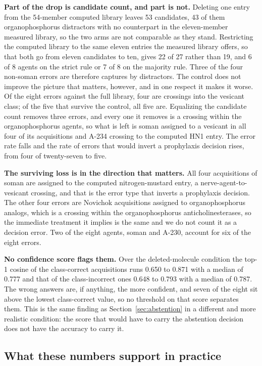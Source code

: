 \documentclass[review,12pt]{elsarticle}
\begin{document}
\textbf{Part of the drop is candidate count, and part is not.} Deleting one entry from the
54-member computed library leaves 53 candidates, 43 of them organophosphorus distractors
with no counterpart in the eleven-member measured library, so the two arms are not
comparable as they stand. Restricting the computed library to the same eleven entries the
measured library offers, so that both go from eleven candidates to ten, gives 22 of 27
rather than 19, and 6 of 8 agents on the strict rule or 7 of 8 on the majority rule. Three
of the four non-soman errors are therefore captures by distractors. The control does not
improve the picture that matters, however, and in one respect it makes it worse. Of the
eight errors against the full library, four are crossings into the vesicant class; of the
five that survive the control, all five are. Equalizing the candidate count removes three
errors, and every one it removes is a crossing within the organophosphorus agents, so what
is left is soman assigned to a vesicant in all four of its acquisitions and A-234 crossing
to the computed HN1 entry. The error rate falls and the rate of errors that would invert a
prophylaxis decision rises, from four of twenty-seven to five.

\textbf{The surviving loss is in the direction that matters.} All four acquisitions of
soman are assigned to the computed nitrogen-mustard entry, a nerve-agent-to-vesicant
crossing, and that is the error type that inverts a prophylaxis decision. The other four
errors are Novichok acquisitions assigned to organophosphorus analogs, which is a crossing
within the organophosphorus anticholinesterases, so the immediate treatment it implies is
the same and we do not count it as a decision error. Two of the eight agents, soman and
A-230, account for six of the eight errors.

\textbf{No confidence score flags them.} Over the deleted-molecule condition the top-1
cosine of the class-correct acquisitions runs 0.650 to 0.871 with a median of 0.777 and
that of the class-incorrect ones 0.648 to 0.793 with a median of 0.787. The wrong answers
are, if anything, the more confident, and seven of the eight sit above the lowest
class-correct value, so no threshold on that score separates them. This is the same
finding as Section~\ref{sec:abstention} in a different and more realistic condition: the
score that would have to carry the abstention decision does not have the accuracy to carry
it.

\subsection{What these numbers support in practice}
\end{document}
